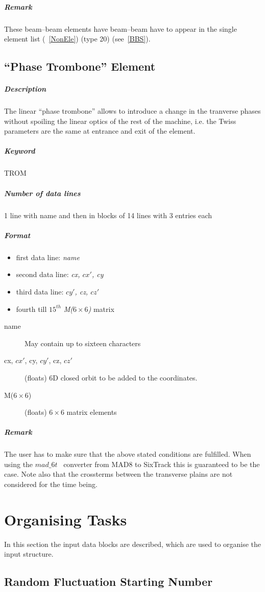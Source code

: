 \documentclass[a4paper,11pt]{report}
\begin{document}
\subparagraph{Remark} These beam--beam elements have beam--beam have
to appear in the single element list (~\ref{NonEle}) (type 20)
(see~\ref{BBS}).

\subsection{``Phase Trombone'' Element} \label{Trombone}

\subparagraph{Description} The linear ``phase trombone'' allows to
introduce a change in the tranverse phases without spoiling the linear
optics of the rest of the machine, i.e. the Twiss parameters are the
same at entrance and exit of the element.  
\subparagraph{Keyword} TROM
\subparagraph{Number of data lines} 1 line with name and then in
blocks of 14 lines with 3 entries each

\subparagraph{Format} 
\begin{itemize}
\item first data line: {\em name}
\item second data line: {\em cx, $cx'$, cy}
\item third data line: {\em $cy'$, cz, $cz'$}
\item fourth till $15^{th}$ {\em M($ 6 \times 6$)} matrix 
\end{itemize}

\begin{description}
\item [name] May contain up to sixteen characters
\item [cx, $cx'$, cy, $cy'$, cz, $cz'$] (floats) 6D closed orbit to be added
  to the coordinates.
\item [M($ 6 \times 6$)] (floats) $ 6 \times 6$ matrix elements
\end{description}

\subparagraph{Remark} The user has to make sure that the above stated
conditions are fulfilled. When using the $mad\_6t$~\cite{CONVERTOR}
converter from MAD8 to SixTrack this is guaranteed to be the case. Note
also that the crossterms between the transverse plains are not
considered for the time being.

\section{Organising Tasks}

In this section the input data blocks are described, which are used to
organise the input structure.

\subsection{Random Fluctuation Starting Number} \label{FluNum}
\end{document}

